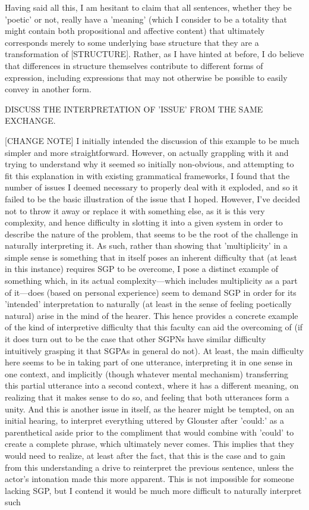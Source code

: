 \documentclass[]{article}
\begin{document}
Having said all this, I am hesitant to claim that all sentences, whether they be 'poetic' or not, really have a 'meaning' (which I consider to be a totality that might contain both propositional and affective content) that ultimately corresponds merely to some underlying base structure that they are a transformation of [STRUCTURE]. Rather, as I have hinted at before, I do believe that differences in structure themselves contribute to different forms of expression, including expressions that may not otherwise be possible to easily convey in another form.



DISCUSS THE INTERPRETATION OF 'ISSUE' FROM THE SAME EXCHANGE.



[CHANGE NOTE] I initially intended the discussion of this example to be much simpler and more straightforward. However, on actually grappling with it and trying to understand why it seemed so initially non-obvious, and attempting to fit this explanation in with existing grammatical frameworks, I found that the number of issues I deemed necessary to properly deal with it exploded, and so it failed to be the basic illustration of the issue that I hoped. However, I've decided not to throw it away or replace it with something else, as it is this very complexity, and hence difficulty in slotting it into a given system in order to describe the nature of the problem, that seems to be the root of the challenge in naturally interpreting it. As such, rather than showing that 'multiplicity' in a simple sense is something that in itself poses an inherent difficulty that (at least in this instance) requires SGP to be overcome, I pose a distinct example of something which, in its actual complexity—which includes multiplicity as a part of it—does (based on personal experience) seem to demand SGP in order for its 'intended' interpretation to naturally (at least in the sense of feeling poetically natural) arise in the mind of the hearer. This hence provides a concrete example of the kind of interpretive difficulty that this faculty can aid the overcoming of (if it does turn out to be the case that other SGPNs have similar difficulty intuitively grasping it that SGPAs in general do not). At least, the main difficulty here seems to be in taking part of one utterance, interpreting it in one sense in one context, and implicitly (though whatever mental mechanism) transferring this partial utterance into a second context, where it has a different meaning, on realizing that it makes sense to do so, and feeling that both utterances form a unity. And this is another issue in itself, as the hearer might be tempted, on an initial hearing, to interpret everything uttered by Glouster after 'could:' as a parenthetical aside prior to the compliment that would combine with 'could' to create a complete phrase, which ultimately never comes. This implies that they would need to realize, at least after the fact, that this is the case and to gain from this understanding a drive to reinterpret the previous sentence, unless the actor's intonation made this more apparent. This is not impossible for someone lacking SGP, but I contend it would be much more difficult to naturally interpret such 
\end{document}
